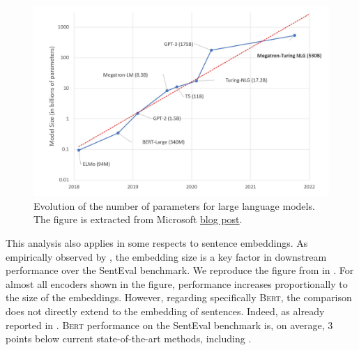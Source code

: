 

\begin{figure}[htb!]
	\includegraphics[width=\textwidth]{images/model-size-graph.jpeg}
	\caption[Large models number of parameters]{Evolution of the number of parameters for large language models. The figure is extracted from Microsoft \href{https://www.microsoft.com/en-us/research/blog/using-deepspeed-and-megatron-to-train-megatron-turing-nlg-530b-the-worlds-largest-and-most-powerful-generative-language-model/}{blog post}.}
\end{figure}

This analysis also applies in some respects to sentence embeddings. As empirically observed by \textcite{conneau_17}, the embedding size is a key factor in downstream performance over the SentEval benchmark. We reproduce the figure from \textcite{conneau_17} in . For almost all encoders shown in the figure, performance increases proportionally to the size of the embeddings. However, regarding specifically \textsc{Bert}, the comparison does not directly extend to the embedding of sentences. Indeed, as already reported in . \textsc{Bert} performance on the SentEval benchmark is, on average, 3 points below current state-of-the-art methods, including \textcite{simoulin_2021a}.

